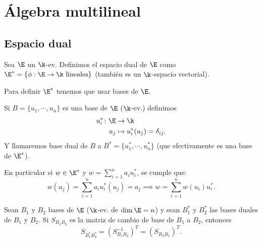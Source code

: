 \chapter{Álgebra multilineal}




\section{Espacio dual}

\begin{defi}
    Sea $\E$ un $\k$-ev. Definimos el espacio dual de $\E$ como
    $\E^* = \{ \phi : \E \to \k \text{ lineales} \}$ (también es un
    $\k$-espacio vectorial).
\end{defi}
\begin{obs}
    Para definir $\E^*$ tenemos que usar bases de $\E$.
\end{obs}
\begin{defi}
    Si $B = \{ u_1,\cdots, u_n \}$ es una base de $\E$ ($\k$-ev.)
    definimos
    \[
        \begin{aligned}
            u_i^* \colon \E &\to \k\\
            u_j &\mapsto u_i^*(u_j) = \delta_{ij}.
        \end{aligned}
    \]
    Y llamaremos base dual de $B$ a
    $B^* = \{ u_1^*, \cdots, u_n^* \}$ (que efectivamente es una
    base de $\E^*$).
\end{defi}
\begin{obs}
    En particular si $w \in \E^*$ y
    $\displaystyle w = \sum_{i=1}^{n} a_i u_i^*$, se cumple que:
    \[
        w(u_j) = \sum_{i=1}^{n} a_i u_i^*(u_j) = a_j
        \implies
        w = \sum_{i=1}^{n}w(u_i)u_i^*.
    \]
\end{obs}

\begin{prop}
    Sean $B_1$ y $B_2$ bases de $\E$ ($\k$-ev. de $\dim  \E = n$) y
    sean $B_1^*$ y $B_2^*$ las bases duales de $B_1$ y $B_2$.
    Si $S_{B_1B_2}$ es la matriz de cambio de base de $B_1$ a
    $B_2$, entonces
    \[
        S_{B_1^*B_2^*} = (S_{B_1B_2}^{-1})^T = (S_{B_2B_1})^T.
    \]
\end{prop}

